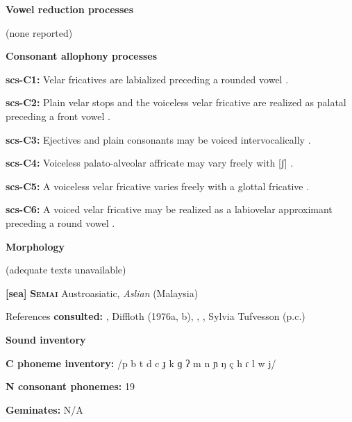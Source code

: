 \textbf{Vowel reduction processes}



(none reported)



\textbf{Consonant allophony processes}



\textbf{scs-C1:} Velar fricatives are labialized preceding a rounded vowel \citep[31]{Rice1989}.



\textbf{scs-C2:} Plain velar stops and the voiceless velar fricative are realized as palatal preceding a front vowel \citep[31]{Rice1989}.



\textbf{scs-C3:} Ejectives and plain consonants may be voiced intervocalically \citep[31]{Rice1989}.



\textbf{scs-C4:} Voiceless palato-alveolar affricate may vary freely with [ʃ] \citep[35]{Rice1989}.



\textbf{scs-C5:} A voiceless velar fricative varies freely with a glottal fricative \citep[32]{Rice1989}.



\textbf{scs-C6:} A voiced velar fricative may be realized as a labiovelar approximant preceding a round vowel \citep[32]{Rice1989}.



\textbf{Morphology}



(adequate texts unavailable)



\textbf{[sea]}   \textbf{\textsc{Semai}  }  Austroasiatic, \textit{Aslian} (Malaysia)



References \textbf{consulted:} \citet{Dentan2003}, Diffloth (1976a, b), \citet{Philips2007}, \citet{Sloan1988}, Sylvia Tufvesson (p.c.)



\textbf{Sound inventory}



\textbf{C phoneme inventory:} /p b t d c ɟ k ɡ ʔ m n ɲ ŋ ç h ɾ l w j/



\textbf{N consonant phonemes:} 19



\textbf{Geminates:} N/A



